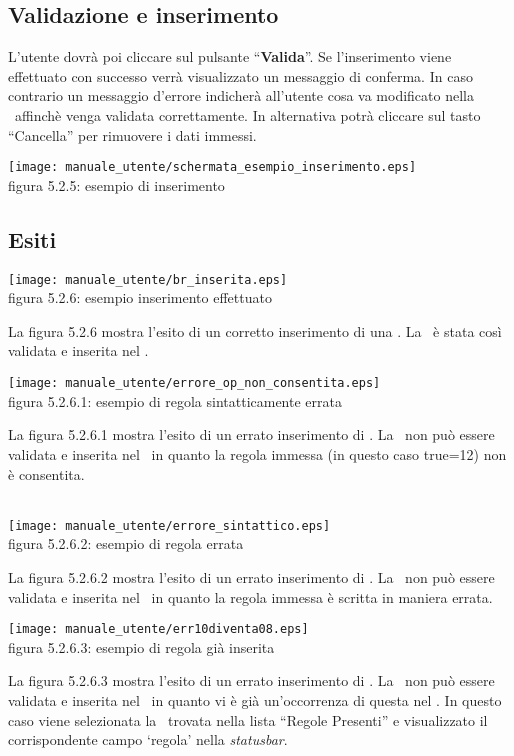 \subsection{Validazione e inserimento}
L'utente dovr\`a poi cliccare sul pulsante ``\textbf{Valida}''. Se l'inserimento viene effettuato con successo verr\`a visualizzato un messaggio di conferma. In caso contrario un messaggio d'errore indicher\`a all'utente cosa va modificato nella \br\ affinch\`e venga validata correttamente. In alternativa potr\`a cliccare sul tasto ``Cancella'' per rimuovere i dati immessi.
\begin{center}
\texttt{[image: manuale\_utente/schermata\_esempio\_inserimento.eps]}\\
 figura 5.2.5: esempio di inserimento
\end{center} 
\subsection{Esiti}
\begin{center}
\texttt{[image: manuale\_utente/br\_inserita.eps]}\\
 figura 5.2.6: esempio inserimento effettuato
\end{center} 
La figura 5.2.6 mostra l'esito di un corretto inserimento di una \br. La \br\ \`e stata cos\`i validata e inserita nel \rp.

\begin{center}
\texttt{[image: manuale\_utente/errore\_op\_non\_consentita.eps]}\\
 figura 5.2.6.1: esempio di regola sintatticamente errata 
\end{center} 
La figura 5.2.6.1 mostra l'esito di un errato inserimento di \br. La \br\ non pu\`o essere validata e inserita nel \rp\ in quanto la regola immessa (in questo caso true=12) non \`e consentita.
\\
\\
\begin{center}
\texttt{[image: manuale\_utente/errore\_sintattico.eps]}\\
 figura 5.2.6.2: esempio di regola errata
\end{center} 
La figura 5.2.6.2 mostra l'esito di un errato inserimento di \br. La \br\ non pu\`o essere validata e inserita nel \rp\ in quanto la regola immessa \`e scritta in maniera errata.

\begin{center}
\texttt{[image: manuale\_utente/err10diventa08.eps]}\\
 figura 5.2.6.3: esempio di regola gi\`a inserita
\end{center} 
La figura 5.2.6.3 mostra l'esito di un errato inserimento di \br. La \br\ non pu\`o essere validata e inserita nel \rp\ in quanto vi \`e gi\`a un'occorrenza di questa nel \rp. In questo caso viene selezionata la \br\ trovata nella lista ``Regole Presenti'' e visualizzato il corrispondente campo `regola' nella \textit{statusbar}.

